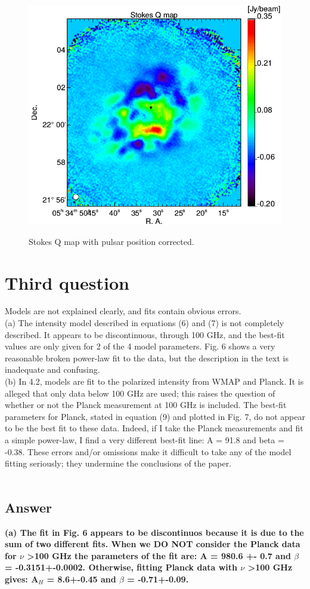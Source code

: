 \documentclass[report,onecolumn]{aa}
\begin{document}
\begin{figure}[!h]
\centering
     	  { \includegraphics[width=0.5\linewidth,keepaspectratio]{referee_figures/crab_q_2mm_pulsPositionCor.png}}
\caption{Stokes Q map with pulsar position corrected.}     	  
 
\label{Q_map}
\end{figure}




\section{Third question}
Models are not explained clearly, and fits contain obvious errors.\\
(a) The intensity model described in equations (6) and (7) is not
completely described. It appears to be discontinuous, through 100
GHz, and the best-fit values are only given for 2 of the 4 model
parameters. Fig. 6 shows a very reasonable broken power-law fit to
the data, but the description in the text is inadequate and confusing.\\
(b) In 4.2, models are fit to the polarized intensity from WMAP and
Planck. It is alleged that only data below 100 GHz are used; this
raises the question of whether or not the Planck measurement at 100
GHz is included. The best-fit parameters for Planck, stated in
equation (9) and plotted in Fig. 7, do not appear to be the best fit
to these data. Indeed, if I take the Planck measurements and fit a
simple power-law, I find a very different best-fit line: A = 91.8 and
beta = -0.38.
These errors and/or omissions make it difficult to take any of the
model fitting seriously; they undermine the conclusions of the paper.
\\ \\
\subsection{\textbf{Answer}}
\textbf{(a)  The fit in Fig. 6 appears to be discontinuos because it is due to the sum of two different fits. When we DO NOT consider the Planck data for $\nu$ \textgreater 100 GHz the parameters of the fit are: A = 980.6 +- 0.7 and $\beta$ = -0.3151+-0.0002.
Otherwise, fitting Planck data with $\nu$ \textgreater 100 GHz gives: A$_H$ = 8.6+-0.45 and $\beta$ = -0.71+-0.09.}
\end{document}
